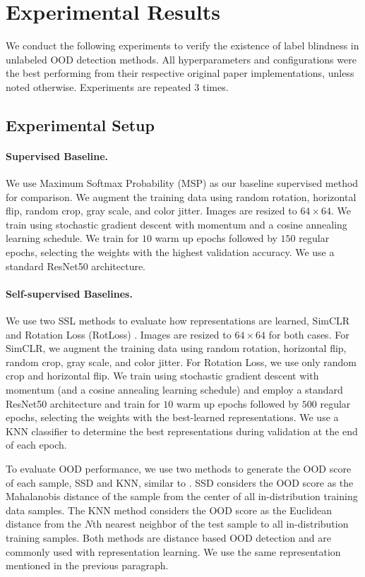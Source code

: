 \documentclass[11pt, oneside]{book}
\theoremstyle{plain}
\theoremstyle{definition}
\theoremstyle{remark}
\begin{document}
\section{Experimental Results}

We conduct the following experiments to verify the existence of label blindness in unlabeled OOD detection methods. All hyperparameters and configurations were the best performing from their respective original paper implementations, unless noted otherwise. Experiments are repeated 3 times.

\subsection{Experimental Setup}

\paragraph{Supervised Baseline.}
We use Maximum Softmax Probability (MSP) \citep{hendrycks2016baseline} as our baseline supervised method for comparison. We augment the training data using random rotation, horizontal flip, random crop, gray scale, and color jitter. Images are resized to $64\times64$. We train using stochastic gradient descent with momentum and a cosine annealing learning schedule. We train for $10$ warm up epochs followed by $150$ regular epochs, selecting the weights with the highest validation accuracy. We use a standard ResNet50 architecture.

\paragraph{Self-supervised Baselines.}
We use two SSL methods to evaluate how representations are learned, SimCLR \citep{chen2020simple} and Rotation Loss (RotLoss) \citep{hendrycks2019using}. Images are resized to $64\times64$ for both cases. For SimCLR, we augment the training data using random rotation, horizontal flip, random crop, gray scale, and color jitter. For Rotation Loss, we use only random crop and horizontal flip. We train using stochastic gradient descent with momentum (and a cosine annealing learning schedule) and employ a standard ResNet50 architecture and train for $10$ warm up epochs followed by $500$ regular epochs, selecting the weights with the best-learned representations. We use a KNN classifier to determine the best representations during validation at the end of each epoch.

To evaluate OOD performance, we use two methods to generate the OOD score of each sample, SSD \citep{sehwag2021ssd} and KNN, similar to \citet{sun2022out}. SSD considers the OOD score as the Mahalanobis distance of the sample from the center of all in-distribution training data samples. The KNN method considers the OOD score as the Euclidean distance from the $N$th nearest neighbor of the test sample to all in-distribution training samples. Both methods are distance based OOD detection and are commonly used with representation learning. We use the same representation mentioned in the previous paragraph.
\end{document}
